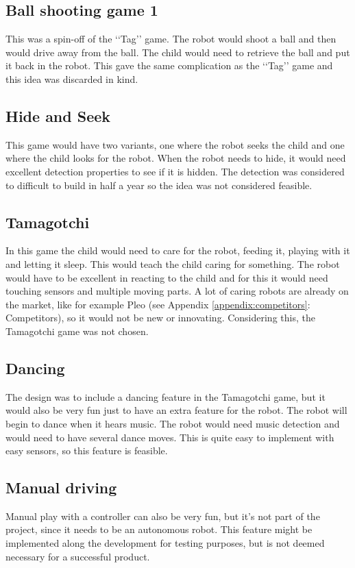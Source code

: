 \documentclass[11pt,twoside,a4paper]{report}
\begin{document}
\subsection{Ball shooting game 1}
This was a spin-off of the \lq\lq{}Tag\rq\rq{} game. The robot would shoot a ball and then would drive away from the ball. The child would need to retrieve the ball and put it back in the robot. This gave the same complication as the \lq\lq{}Tag\rq\rq{} game and this idea was discarded in kind.
\subsection{Hide and Seek}
This game would have two variants, one where the robot seeks the child and one where the child looks for the robot. When the robot needs to hide, it would need excellent detection properties to see if it is hidden. The detection was considered to difficult to build in half a year so the idea was not considered feasible.
\subsection{Tamagotchi}
In this game the child would need to care for the robot, feeding it, playing with it and letting it sleep. This would teach the child caring for something. The robot would have to be excellent in reacting to the child and for this it would need touching sensors and multiple moving parts. A lot of caring robots are already on the market, like for example Pleo (see Appendix \ref{appendix:competitors}: Competitors), so it would not be new or innovating. Considering this, the Tamagotchi game was not chosen.
\subsection{Dancing}
The design was to include a dancing feature in the Tamagotchi game, but it would also be very fun just to have an extra feature for the robot. The robot will begin to dance when it hears music. The robot would need music detection and would need to have several dance moves. This is quite easy to implement with easy sensors, so this feature is feasible.
\subsection{Manual driving}
Manual play with a controller can also be very fun, but it\rq{}s not part of the project, since it needs to be an autonomous robot. This feature might be implemented along the development for testing purposes, but is not deemed necessary for a successful product.
\end{document}

